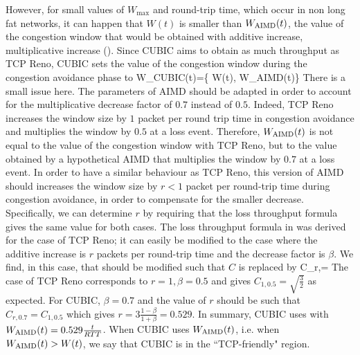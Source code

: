 However, for small values of $W_{\max}$ and round-trip time, which occur in non long fat networks, it can happen that $W(t)$ is smaller than $W_{\mbox{\scriptsize AIMD}}(t)$, the value of the congestion window that would be obtained with additive increase, multiplicative increase (). Since CUBIC aims to obtain as much throughput as TCP Reno, CUBIC sets the value of the congestion window during the congestion avoidance phase to
\be
 W_{\mbox{\scriptsize CUBIC}}(t)=\max\left \{ W(t), W_{\mbox{\scriptsize AIMD}}(t)\right\}
 \label{eq-cubicca}
\ee
There is a small issue here.
The parameters of AIMD should be
adapted in order to account for the multiplicative decrease factor of $0.7$ instead of $0.5$. Indeed, TCP Reno increases the window size by $1$ packet per round trip time in congestion avoidance and multiplies the window by  $0.5$ at a loss event. Therefore, $W_{\mbox{\scriptsize AIMD}}(t)$ is not equal to the value of the congestion window with TCP Reno, but to the value obtained by a hypothetical AIMD that multiplies the window by $0.7$ at a loss event. In order to have a similar behaviour as TCP Reno, this version of AIMD should increases the window size by $r<1$ packet per round-trip time during congestion avoidance, in order to compensate for the smaller decrease. Specifically, we can determine $r$ by requiring that the loss throughput formula  gives the same value for both cases. The loss throughput formula in  was derived for the case of TCP Reno; it can easily be modified to the case where the additive increase is $r$ packets per round-trip time and the decrease factor is $\beta$. We find, in this case, that  should be modified such that $C$ is replaced by
 \be
 C_{r,\beta}=
 \label{eq-ltgen}
 \ee
 The case of TCP Reno corresponds to $r=1,\beta=0.5$ and gives $C_{1, 0.5}=\sqrt{\frac{3}{2}}$ as expected. For CUBIC, $\beta=0.7$ and the value of $r$ should be such that $C_{r,0.7}=C_{1,0.5}$ which gives
 $ r=3\frac{1-\beta}{1+\beta}=0.529$.
 In summary, CUBIC uses  with $W_{\mbox{\scriptsize AIMD}}(t)=0.529 \frac{t}{RTT}$. When CUBIC uses $W_{\mbox{\scriptsize AIMD}}(t)$, i.e. when $W_{\mbox{\scriptsize AIMD}}(t)> W(t)$, we say that CUBIC is in the ``TCP-friendly" region.


 \begin{figure}[h]
        \protect\label{fig-cubic2}
\end{figure}

